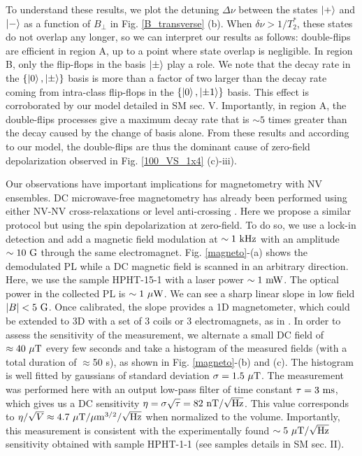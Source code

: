 \documentclass[preprintnumbers,amsmath,amssymb,superscriptaddress,twocolumn,showpacs]{revtex4-2}
\begin{document}
To understand these results, we plot the detuning $\Delta \nu$ between the states $\ket{+}$ and $\ket{-}$ as a function of $B_{\perp}$ in Fig. \ref{B_transverse} (b). When $\delta \nu > 1/T_2^*$, these states do not overlap any longer, so we can interpret our results as follows: double-flips are efficient in region A, up to a point where state overlap is negligible. In region B, only the flip-flops in the basis $\ket{\pm}$ play a role. We note that the decay rate in the $\{ \ket{0}, \ket{\pm} \}$ basis is more than a factor of two larger than the decay rate coming from intra-class flip-flops in the $\{\ket{0}, \ket{\pm 1} \}$ basis. This effect is corroborated by our model detailed in SM sec. V. Importantly, in region A, the double-flips processes give a maximum decay rate that is $\sim 5$ times greater than the decay caused by the change of basis alone. From these results and according to our model, the double-flips are thus the dominant cause of zero-field depolarization observed in Fig. \ref{100_VS_1x4} (c)-iii).

Our observations have important implications for magnetometry with NV ensembles.
DC microwave-free magnetometry has already been performed using either NV-NV cross-relaxations \citep{akhmedzhanov_microwave-free_2017,akhmedzhanov_magnetometry_2019} or level anti-crossing \citep{Wickenbrock, zheng2017level, zheng_microwave-free_2020}. Here we propose a similar protocol but using the spin depolarization at zero-field. 
To do so, we use a lock-in detection and add a magnetic field modulation at $\sim 1\ \rm kHz$ with an amplitude $\sim 10\ \rm G$ through the same electromagnet. Fig. \ref{magneto}-(a) shows the demodulated PL while a DC magnetic field is scanned in an arbitrary direction. Here, we use the sample HPHT-15-1 with a laser power $\sim 1\ \rm mW$. The optical power in the collected PL is $\sim 1\ \mu\rm W$.  We can see a sharp linear slope in low field $\abs{B} < 5\ \rm G$. Once calibrated, the slope provides a 1D magnetometer, which could be extended to 3D with a set of 3 coils or 3 electromagnets, as in \cite{zheng_microwave-free_2020}. In order to assess the sensitivity of the measurement, we alternate a small DC field of $\approx 40\ \mu\rm{T}$ every few seconds and take a histogram of the measured fields (with a total duration of $\approx $50 s), as shown in Fig. \ref{magneto}-(b) and (c). The histogram is well fitted by gaussians of standard deviation $\sigma=1.5\ \mu \rm T$. The measurement was performed here with an output low-pass filter of time constant $\tau=3\ \rm ms$, which gives us a DC sensitivity $\eta=\sigma \sqrt{\tau}=82\ \rm{nT}/\sqrt{\rm Hz}$. This value corresponds to $\eta/\sqrt{V}\approx 4.7 \ \mu \rm{T}/\mu m^{3/2}/\sqrt{\rm Hz}$ when normalized to the volume. Importantly, this measurement is consistent with the experimentally found $\sim 5\ \mu \rm{T}/\sqrt{\rm Hz}$ sensitivity obtained with sample HPHT-1-1 (see samples details in SM sec. II). 
\end{document}
